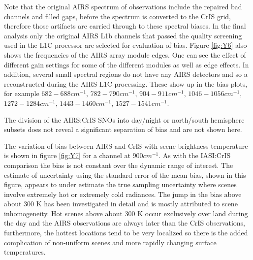\documentclass[twocolumn,10pt]{article}
\begin{document}

Note that the original AIRS spectrum of observations include the repaired bad channels and filled gaps, before the spectrum is converted to the CrIS grid, therefore those artifacts are carried through to these spectral biases. In the final analysis only the original AIRS L1b channels that passed the quality screening used in the L1C processor are selected for evaluation of bias. Figure \ref{fig:Y6} also shows the frequencies of the AIRS array module edges. One can see the effect of different gain settings for some of the different modules as well as edge effects. In addition, several small spectral regions do not have any AIRS detectors and so a reconstructed during the AIRS L1C processing. These show up in the bias plots, for example $ 682 - 688 cm^{-1} $, $ 782 - 790 cm^{-1} $, $ 904 - 911 cm^{-1} $, $ 1046 - 1056 cm^{-1} $, $ 1272 - 1284 cm^{-1} $, $ 1443 - 1460 cm^{-1} $, $ 1527 - 1541 cm^{-1} $.

The division of the AIRS:CrIS SNOs into day/night or north/south hemisphere subsets does not reveal a significant separation of bias and are not shown here.

The variation of bias between AIRS and CrIS with scene brightness temperature is shown in figure \ref{fig:Y7} for a channel at $ 900 cm^{-1} $. As with the IASI:CrIS comparison the bias is not constant over the dynamic range of interest. The estimate of uncertainty using the standard error of the mean bias, shown in this figure, appears to under estimate the true sampling uncertainty where scenes involve extremely hot or extremely cold radiances. The jump in the bias above about 300 K has been investigated in detail and is mostly attributed to scene inhomogeneity. Hot scenes above about 300 K occur exclusively over land during the day and the AIRS observations are always later than the CrIS observations, furthermore, the hottest locations tend to be very localized so there is the added complication of non-uniform scenes and more rapidly changing surface temperatures.
\end{document}
